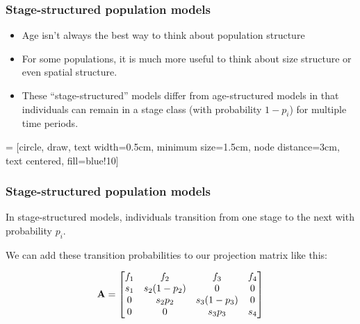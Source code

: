 \documentclass[color=usenames,dvipsnames]{beamer}\usepackage[]{graphicx}\usepackage[]{color}
\begin{document}
\begin{frame}
  \frametitle{Stage-structured population models}
  \begin{itemize}
    \item Age isn't always the best way to think about population structure
    \item<2-> For some populations, it is much more useful to think about size
      structure or even spatial structure.
    \item<3->  These ``stage-structured'' models differ from age-structured models
      in that individuals can remain in a stage class (with
      probability $1-p_i$) for multiple time periods.
  \end{itemize}
   = [circle, draw, text width=0.5cm, minimum size=1.5cm,
  node distance=3cm, text centered, fill=blue!10]
  \begin{center}
  \end{center}
\end{frame}






\begin{frame}
  \frametitle{Stage-structured population models}
  \large
  {In stage-structured models, individuals transition from one
    stage to the next with probability $p_i$. \par
    \vfill
    \pause
    We can add these
    transition probabilities to our projection matrix like this:}
  \pause
  \vfill
  \begin{center}
    \[
    {\bf A} =
    \begin{bmatrix}
      f_1 & f_2 & f_3 & f_4 \\
      s_1 & s_2(1-p_2) & 0 & 0 \\
      0 & s_2 p_2 & s_3(1-p_3) & 0 \\
      0 & 0 & s_3p_3 & s_4
    \end{bmatrix}
    \]
  \end{center}
\end{frame}
\end{document}
